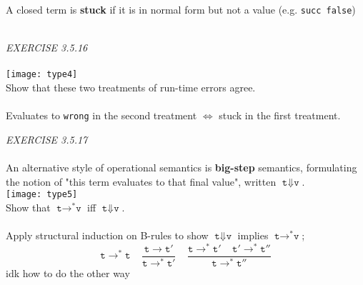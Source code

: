 \documentclass{article}
\begin{document}
A closed term is \textbf{stuck} if it is in normal form but not a value (e.g. \texttt{succ false})\\\\
\begin{siderules}\color{blue}\textit{EXERCISE 3.5.16}\color{black}\\\\
    \texttt{[image: type4]}\\
\color{blue}Show that these two treatments of run-time errors agree.\color{black}\\\\
Evaluates to \texttt{wrong} in the second treatment \(\Longleftrightarrow\) stuck in the first treatment.
\end{siderules}
\begin{siderules}\color{blue}\textit{EXERCISE 3.5.17}\color{black}\\\\
\color{blue} An alternative style of operational semantics is \textbf{big-step} semantics, formulating the notion of "this term evaluates to that final value", written \(\texttt{t}\Downarrow \texttt{v}\).\\
\texttt{[image: type5]}\\
Show that \(\texttt{t}\to^{*} \texttt{v}\) iff \(\texttt{t}\Downarrow \texttt{v}\).\\\\\color{black}
Apply structural induction on B-rules to show \(\texttt{t}\Downarrow \texttt{v}\) implies \(\texttt{t}\to^{*}\texttt{v}\); 
\[\texttt{t}\to^{*}\texttt{t}\;\;\;\;\frac{\texttt{t}\to \texttt{t}'}{\texttt{t}\to^{*} \texttt{t}'}\;\;\;\;\frac{\texttt{t}\to^{*}\texttt{t}'\;\;\;\;\texttt{t}'\to^{*}\texttt{t}''}{\texttt{t}\to^{*}\texttt{t}''}\]
\color{red}idk how to do the other way\color{black}
\end{siderules}
\pagebreak
\end{document}
